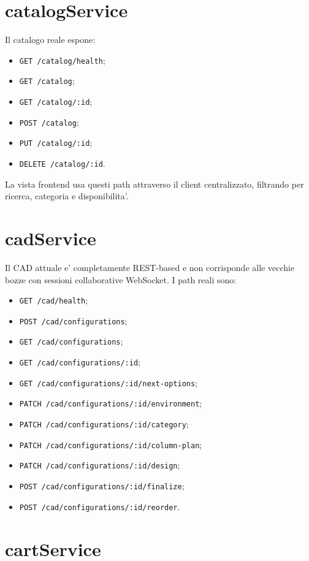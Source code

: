 \section{catalogService}

Il catalogo reale espone:

\begin{itemize}
\item \texttt{GET /catalog/health};
\item \texttt{GET /catalog};
\item \texttt{GET /catalog/:id};
\item \texttt{POST /catalog};
\item \texttt{PUT /catalog/:id};
\item \texttt{DELETE /catalog/:id}.
\end{itemize}

La vista frontend usa questi path attraverso il client centralizzato, filtrando per ricerca, categoria e disponibilita'.

\section{cadService}

Il CAD attuale e' completamente REST-based e non corrisponde alle vecchie bozze con sessioni collaborative WebSocket. I path reali sono:

\begin{itemize}
\item \texttt{GET /cad/health};
\item \texttt{POST /cad/configurations};
\item \texttt{GET /cad/configurations};
\item \texttt{GET /cad/configurations/:id};
\item \texttt{GET /cad/configurations/:id/next-options};
\item \texttt{PATCH /cad/configurations/:id/environment};
\item \texttt{PATCH /cad/configurations/:id/category};
\item \texttt{PATCH /cad/configurations/:id/column-plan};
\item \texttt{PATCH /cad/configurations/:id/design};
\item \texttt{POST /cad/configurations/:id/finalize};
\item \texttt{POST /cad/configurations/:id/reorder}.
\end{itemize}

\section{cartService}

